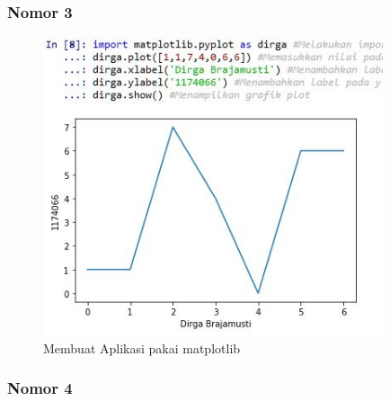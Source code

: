 \subsubsection{Nomor 3}
\hfill\break

\begin{figure}[H]
\centerline{\includegraphics[width=10cm]{figures/1174074/3/6.jpg}}
\caption{Membuat Aplikasi pakai matplotlib}
\label{labelgambar}
\end{figure}

\subsubsection{Nomor 4}
\hfill\break

